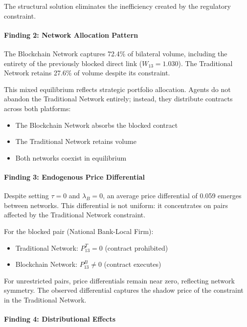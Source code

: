 The structural solution eliminates the inefficiency created by the regulatory constraint.

\paragraph{Finding 2: Network Allocation Pattern}

The Blockchain Network captures 72.4\% of bilateral volume, including the entirety of the previously blocked direct link ($W_{13} = 1.030$). The Traditional Network retains 27.6\% of volume despite its constraint.

This mixed equilibrium reflects strategic portfolio allocation. Agents do not abandon the Traditional Network entirely; instead, they distribute contracts across both platforms:
\begin{itemize}
    \item The Blockchain Network absorbs the blocked contract
    \item The Traditional Network retains volume
    \item Both networks coexist in equilibrium
\end{itemize}

\paragraph{Finding 3: Endogenous Price Differential}

Despite setting $\tau=0$ and $\lambda_B=0$, an average price differential of 0.059 emerges between networks. This differential is not uniform: it concentrates on pairs affected by the Traditional Network constraint.

For the blocked pair (National Bank-Local Firm):
\begin{itemize}
    \item Traditional Network: $P^T_{13} = 0$ (contract prohibited)
    \item Blockchain Network: $P^B_{13} \neq 0$ (contract executes)
\end{itemize}

For unrestricted pairs, price differentials remain near zero, reflecting network symmetry. The observed differential captures the shadow price of the constraint in the Traditional Network.

\paragraph{Finding 4: Distributional Effects}

